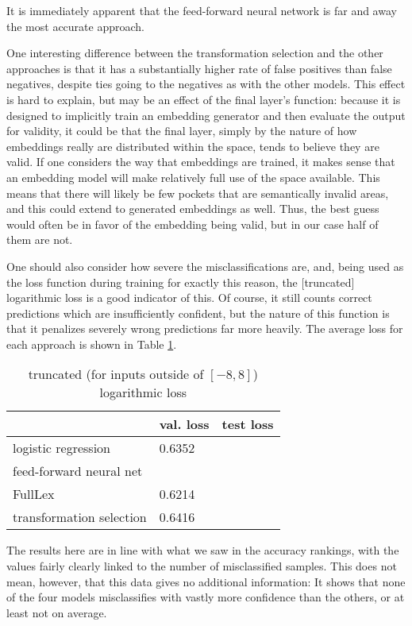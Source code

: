 \documentclass[a4paper, 11pt]{scrartcl}
\begin{document}
It is immediately apparent that the feed-forward neural network is far and away the most accurate approach.

One interesting difference between the transformation selection and the other approaches is that it has a substantially higher rate of false positives than false negatives, despite ties going to the negatives as with the other models. This effect is hard to explain, but may be an effect of the final layer's function: because it is designed to implicitly train an embedding generator and then evaluate the output for validity, it could be that the final layer, simply by the nature of how embeddings really are distributed within the space, tends to believe they are valid. If one considers the way that embeddings are trained, it makes sense that an embedding model will make relatively full use of the space available. This means that there will likely be few pockets that are semantically invalid areas, and this could extend to generated embeddings as well. Thus, the best guess would often be in favor of the embedding being valid, but in our case half of them are not.

One should also consider how severe the misclassifications are, and, being used as the loss function during training for exactly this reason, the [truncated] logarithmic loss is a good indicator of this. Of course, it still counts correct predictions which are insufficiently confident, but the nature of this function is that it penalizes severely wrong predictions far more heavily. The average loss for each approach is shown in Table \ref{loss}.

\begin{table}[]
	\centering
	\begin{tabular}{l|l|l}
		                         & val. loss & test loss \\ \hline
		logistic regression      & 0.6352    &           \\
		feed-forward neural net  &           &           \\
		FullLex                  & 0.6214    &           \\
		transformation selection & 0.6416    &          
	\end{tabular}
	\caption{truncated (for inputs outside of $[-8, 8]$) logarithmic loss}
	\label{loss}
\end{table}

The results here are in line with what we saw in the accuracy rankings, with the values fairly clearly linked to the number of misclassified samples. This does not mean, however, that this data gives no additional information: It shows that none of the four models misclassifies with vastly more confidence than the others, or at least not on average.
\end{document}
